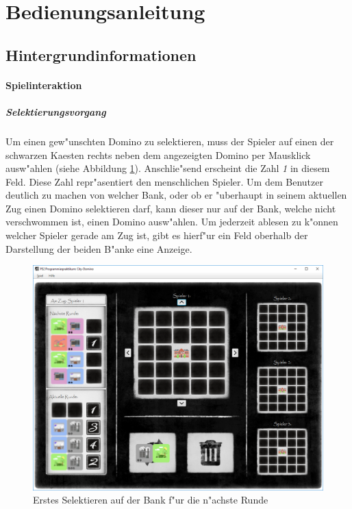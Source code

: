 \section{Bedienungsanleitung}
\subsection{Hintergrundinformationen}
\FloatBarrier

\paragraph{Spielinteraktion}
\subparagraph{Selektierungsvorgang}
Um einen gew"unschten Domino zu selektieren, muss der Spieler auf einen der schwarzen Kaesten rechts neben dem angezeigten Domino per Mausklick ausw"ahlen (siehe Abbildung \ref{fig:erstesSelektierenNaechsteBank}). Anschlie"send erscheint die Zahl \emph{1} in diesem Feld. Diese Zahl repr"asentiert den menschlichen Spieler. Um dem Benutzer deutlich zu machen von welcher Bank, oder ob er "uberhaupt in seinem aktuellen Zug einen Domino selektieren darf, kann dieser nur auf der Bank, welche nicht verschwommen ist, einen Domino ausw"ahlen. Um jederzeit ablesen zu k"onnen welcher Spieler gerade am Zug ist, gibt es hierf"ur ein Feld oberhalb der Darstellung der beiden B"anke eine Anzeige. 

\begin{figure}
	\centering
	\includegraphics{screenshots/screenshot_ErstesSelektierenAufNaechsterBank}
	\caption[Erstes Selektieren]{Erstes Selektieren auf der Bank f"ur die n"achste Runde}
	\label{fig:erstesSelektierenNaechsteBank}
\end{figure}


